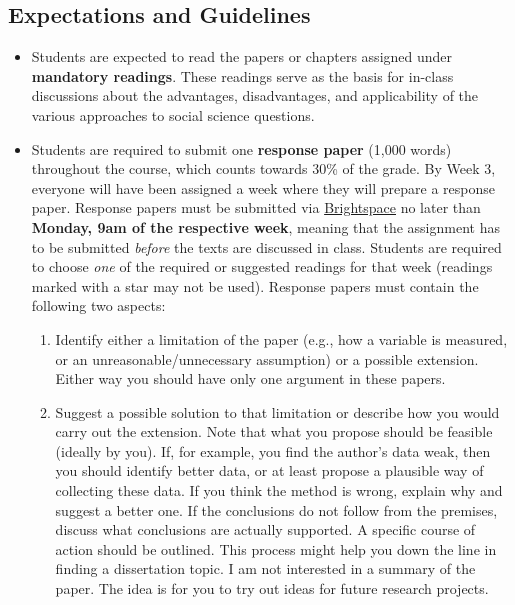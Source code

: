 \documentclass[abstract=on,parskip=full,headings=standardclasses,fontsize=11pt,paper=a4]{scrartcl}
\begin{document}
\subsection*{Expectations and Guidelines}
\begin{itemize}


\item Students are expected to read the papers or chapters assigned under \textbf{mandatory readings}. These readings serve as the basis for in-class discussions about the advantages, disadvantages, and applicability of the various approaches to social science questions. 

\item Students are required to submit one \textbf{response paper} (1,000 words) throughout the course, which counts towards 30\% of the grade. By Week 3, everyone will have been assigned a week where they will prepare a response paper. Response papers must be submitted via \href{https://brightspace.ucd.ie/d2l/home}{Brightspace} no later than \textbf{Monday, 9am of the respective week}, meaning that the assignment has to be submitted \textit{before} the texts are discussed in class. Students are required to choose \textit{one} of the required or suggested readings for that week (readings marked with a star may not be used).  Response papers must contain the following two aspects:
\begin{enumerate}
\item Identify either a limitation of the paper (e.g., how a variable is measured, or an unreasonable/unnecessary assumption) or a possible extension. Either way you should have only one argument in these papers.
\item Suggest a possible solution to that limitation or describe how you would carry out the extension. Note that what you propose should be feasible (ideally by you). If, for example, you find the author's data weak, then you should identify better data, or at least propose a plausible way of collecting these data. If you think the method is wrong, explain why and suggest a better one. If the conclusions do not follow from the premises, discuss what conclusions are actually supported. A specific course of action should be outlined. This process might help you down the line in finding a dissertation topic.
I am not interested in a summary of the paper. The idea is for you to try out ideas for future research projects.
\end{enumerate}



\end{itemize}
\end{document}
